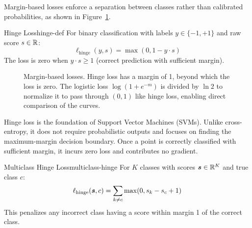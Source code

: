 \documentclass[../../main.tex]{subfiles}
\begin{document}
Margin-based losses enforce a separation between classes rather than calibrated probabilities, as shown in Figure~\ref{fig:margin-losses}.

\begin{definition}{Hinge Loss}{hinge-def}
For binary classification with labels $y \in \{-1, +1\}$ and raw score $s \in \mathbb{R}$:
\[
    \ell_{\text{hinge}}(y, s) = \max(0, 1 - y \cdot s)
\]
The loss is zero when $y \cdot s \geq 1$ (correct prediction with sufficient margin).
\end{definition}

\begin{figure}[htbp]
\centering
{}
\caption{Margin-based losses. Hinge loss has a margin of 1, beyond which the loss is zero. The logistic loss $\log(1+e^{-m})$ is divided by $\ln 2$ to normalize it to pass through $(0, 1)$ like hinge loss, enabling direct comparison of the curves.}
\label{fig:margin-losses}
\end{figure}

\begin{keyconcept}
Hinge loss is the foundation of Support Vector Machines (SVMs). Unlike cross-entropy, it does not require probabilistic outputs and focuses on finding the maximum-margin decision boundary. Once a point is correctly classified with sufficient margin, it incurs zero loss and contributes no gradient.
\end{keyconcept}

\begin{definition}{Multiclass Hinge Loss}{multiclass-hinge}
For $K$ classes with scores $\boldsymbol{s} \in \mathbb{R}^K$ and true class $c$:
\[
    \ell_{\text{hinge}}(\boldsymbol{s}, c) = \sum_{k \neq c} \max(0, s_k - s_c + 1)
\]
This penalizes any incorrect class having a score within margin 1 of the correct class.
\end{definition}
\end{document}
